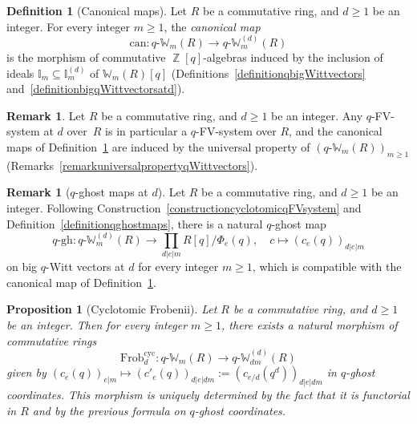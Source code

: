 \documentclass[10pt,twoside]{scrarticle}
\newlength{\mar} \setlength{\mar}{1cm}%
\newlength{\len}
\newtheorem{proposition}[theorem]{Proposition}
\theoremstyle{definition}
\newtheorem{remark}[theorem]{Remark}
\newtheorem{definition}[theorem]{Definition}
\DeclareMathOperator{\Z}{\mathbb{Z}}
\newcommand{\can}{\text{can}}
\newcommand{\Frob}{\mathrm{Frob}}
\newcommand{\Cyc}{\mathrm{cyc}}
\newcommand{\W}{\mathbb{W}}
\newcommand{\qWm}{q\text{-}\mathbb{W}_m}
\newcommand{\gh}{\mathrm{gh}}
\renewcommand{\ge}{\geqslant}
\numberwithin{equation}{theorem}
\begin{document}
\begin{definition}[Canonical maps]\label{definitioncanonicalmapsqWittvectors}
    Let $R$ be a commutative ring, and $d \ge 1$ be an integer. For every integer $m \ge 1$, the \emph{canonical map}
    $$\can : \qWm(R) \longrightarrow \qWm^{(d)}(R)$$
    is the morphism of commutative $\Z[q]$-algebras induced by the inclusion of ideals $\mathbb{I}_m \subseteq \mathbb{I}_m^{(d)}$ of $\W_m(R)[q]$ (Definitions~\ref{definitionqbigWittvectors} and~\ref{definitionbigqWittvectorsatd}).
\end{definition}

\begin{remark}
    Let $R$ be a commutative ring, and $d \ge 1$ be an integer. Any $q$-FV-system at $d$ over~$R$ is in particular a $q$-FV-system over $R$, and the canonical maps of Definition~\ref{definitioncanonicalmapsqWittvectors} are induced by the universal property of $(\qWm(R))_{m \ge 1}$ (Remarks~\ref{remarkuniversalpropertyqWittvectors}).
\end{remark}

\begin{remark}[$q$-ghost maps at $d$]
    Let $R$ be a commutative ring, and $d \ge 1$ be an integer. Following Construction~\ref{constructioncyclotomicqFVsystem} and Definition~\ref{definitionqghostmaps}, there is a natural $q$-ghost map 
    $$q\text{-}\gh : \qWm^{(d)}(R) \longrightarrow \prod_{d|e|m} R[q]/\Phi_e(q), \quad c \longmapsto (c_e(q))_{d|e|m}$$
    on big $q$-Witt vectors at $d$ for every integer $m \ge 1$, which is compatible with the canonical map of Definition~\ref{definitioncanonicalmapsqWittvectors}.
\end{remark}


\begin{proposition}[Cyclotomic Frobenii]\label{propositioncyclotomicFrobeniiqWittvectors}
    Let $R$ be a commutative ring, and $d \ge 1$ be an integer. Then for every integer $m \ge 1$, there exists a natural morphism of commutative rings
    $$\Frob_d^{\Cyc} : \qWm(R) \longrightarrow q\text{-}\W_{dm}^{(d)}(R)$$
    given by $(c_e(q))_{e|m} \mapsto (c'_e(q))_{d|e|dm} := (c_{e/d}(q^d))_{d|e|dm}$ in $q$-ghost coordinates. This morphism is uniquely determined by the fact that it is functorial in $R$ and by the previous formula on $q$-ghost coordinates.
\end{proposition}
\end{document}
